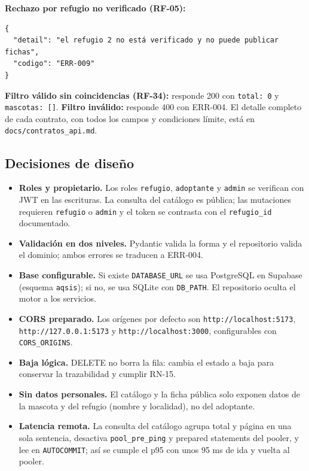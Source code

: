 \documentclass[11pt,a4paper]{article}
\newcommand{\code}[1]{\texttt{#1}}
\begin{document}
\textbf{Rechazo por refugio no verificado (RF-05):}

\begin{lstlisting}
{
  "detail": "el refugio 2 no está verificado y no puede publicar fichas",
  "codigo": "ERR-009"
}
\end{lstlisting}

\textbf{Filtro válido sin coincidencias (RF-34):} responde 200 con
\code{total: 0} y \code{mascotas: []}. \textbf{Filtro inválido:} responde 400
con ERR-004. El detalle completo de cada contrato, con todos los campos y
condiciones límite, está en \code{docs/contratos\_api.md}.

\subsection{Decisiones de diseño}

\begin{itemize}
\item \textbf{Roles y propietario.} Los roles \code{refugio},
  \code{adoptante} y \code{admin} se verifican con JWT en las escrituras.
  La consulta del catálogo es pública; las mutaciones requieren \code{refugio}
  o \code{admin} y el token se contrasta con el \code{refugio\_id} documentado.
\item \textbf{Validación en dos niveles.} Pydantic valida la forma y el
  repositorio valida el dominio; ambos errores se traducen a ERR-004.
\item \textbf{Base configurable.} Si existe \code{DATABASE\_URL} se usa
  PostgreSQL en Supabase (esquema \code{aqsis}); si no, se usa SQLite con
  \code{DB\_PATH}. El repositorio oculta el motor a los servicios.
\item \textbf{CORS preparado.} Los orígenes por defecto son
  \code{http://localhost:5173}, \code{http://127.0.0.1:5173} y
  \code{http://localhost:3000}, configurables con \code{CORS\_ORIGINS}.
\item \textbf{Baja lógica.} DELETE no borra la fila: cambia el estado a baja
  para conservar la trazabilidad y cumplir RN-15.
\item \textbf{Sin datos personales.} El catálogo y la ficha pública solo
  exponen datos de la mascota y del refugio (nombre y localidad), no del
  adoptante.
\item \textbf{Latencia remota.} La consulta del catálogo agrupa total y página
  en una sola sentencia, desactiva \code{pool\_pre\_ping} y prepared
  statements del pooler, y lee en \code{AUTOCOMMIT}; así se cumple el p95 con
  unos 95 ms de ida y vuelta al pooler.
\end{itemize}
\end{document}
